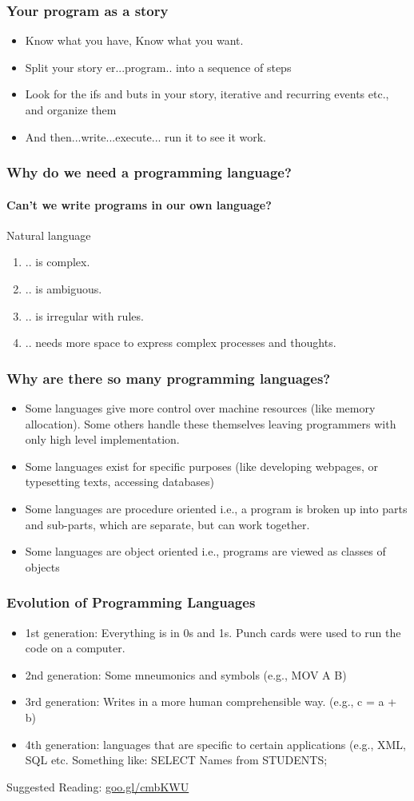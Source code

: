 \documentclass{beamer}
\begin{document}
\begin{frame}
\frametitle{Your program as a story}
\begin{itemize}
\item Know what you have, Know what you want.
\item Split your story er...program.. into a sequence of steps
\item Look for the ifs and buts in your story, iterative and recurring events etc., and organize them
\item And then...write...execute... run it to see it work.
\end{itemize}
\end{frame}

\begin{frame}%
\frametitle{Why do we need a programming language?}
\framesubtitle{Can't we write programs in our own language?}
Natural language
\begin{enumerate}
\item .. is complex.\pause
\item .. is ambiguous.\pause
\item .. is irregular with rules. \pause
\item .. needs more space to express complex processes and thoughts.
\end{enumerate}
\end{frame}

\begin{frame}%
\frametitle{Why are there so many programming languages?}
\begin{itemize}
\item Some languages give more control over machine resources (like memory allocation). Some others handle these themselves leaving programmers with only high level implementation.
\item Some languages exist for specific purposes (like developing webpages, or typesetting texts, accessing databases)
\item Some languages are procedure oriented i.e., a program is broken up into parts and sub-parts, which are separate, but can work together. 
\item Some languages are object oriented i.e., programs are viewed as classes of objects
\end{itemize}
\end{frame}

\begin{frame}%
\frametitle{Evolution of Programming Languages}
\begin{itemize}
\item 1st generation: Everything is in 0s and 1s. Punch cards were used to run the code on a computer.
\item 2nd generation: Some mneumonics and symbols (e.g., MOV A B)
\item 3rd generation: Writes in a more human comprehensible way. (e.g., c = a + b)
\item 4th generation: languages that are specific to certain applications (e.g., XML, SQL etc. Something like: SELECT Names from STUDENTS;
\end{itemize}
Suggested Reading: \url{goo.gl/cmbKWU}
\end{frame}
\end{document}
